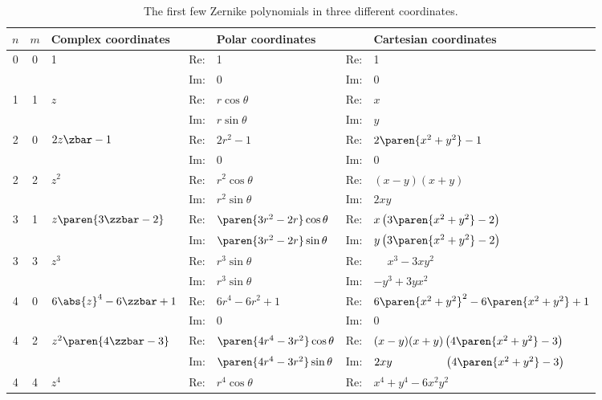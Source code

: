 \begin{landscape}
\begin{table}[htbp]
\caption[The first few Zernike polynomials in three different coordinates]{The first few Zernike polynomials in three different coordinates. }
\begin{center}
{\scriptsize
\begin{tabular}{cclllll}
%
 $n$ & $m$ & Complex coordinates && Polar coordinates && Cartesian coordinates \\\hline
%
 0 & 0 & 1 & Re: & 1 & Re: & 1 \\[2pt]
   &   &   & Im: & 0 & Im: & 0 \\[4pt]
%
  1 & 1 & $z$ & Re: & $r\cos\theta$ & Re: & $x$ \\[2pt]
    &   &     & Im: & $r\sin\theta$ & Im: & $y$ \\[4pt]
%
  2 & 0 & $2z\zbar-1$ 
    & Re: & $2r^{2}-1$ & Re: & $2\paren{x^{2} + y^{2}}-1$ \\[2pt]
    &   &        
    & Im: & 0 & Im: & 0 \\[2pt]
  2 & 2 & $z^{2}$ 
    & Re: & $r^{2}\cos\theta$ & Re: & $(x-y) (x+y)$ \\[2pt]
    &   &         
    & Im: & $r^{2}\sin\theta$ & Im: & $2xy$ \\[4pt]
%
  3 & 1 & $z\paren{3\zzbar-2}$ 
    & Re: & $\paren{3r^{2}-2r}\cos\theta$ 
    & Re: & $x \left(3 \paren{x^2 + y^2} - 2\right)$ \\[2pt]
    &   &         
    & Im: & $\paren{3r^{2}-2r}\sin\theta$ 
    & Im: & $y \left(3 \paren{x^2 + y^2} - 2\right)$ \\[2pt]
  3 & 3 & $z^{3}$ 
    & Re: & $r^{3}\sin\theta$ 
    & Re: & $\phantom{-}x^{3} - 3xy^{2}$ \\[2pt]
    &   &         
    & Im: & $r^{3}\sin\theta$ 
    & Im: & $-y^{3} + 3yx^{2}$ \\[4pt]
%
  4 & 0 & $6\abs{z}^{4}-6\zzbar+1$ & Re: & $6r^{4}-6r^{2}+1$ & Re: & $6\paren{x^{2} + y^{2}}^{2}-6\paren{x^{2} + y^{2}} + 1$ \\[2pt]
    &   &         & Im: & 0 & Im: & 0 \\[2pt]
  4 & 2 & $z^{2}\paren{4\zzbar-3}$ & Re: & $\paren{4r^{4}-3r^{2}}\cos\theta$ 
    & Re: & $(x-y) (x+y) \left(4 \paren{x^2 + y^2}-3\right)$ \\[2pt]
    &   &         
    & Im: & $\paren{4r^{4}-3r^{2}}\sin\theta$& Im: & $2 x y \qquad \qquad \ \ \left(4 \paren{x^2 + y^2}-3\right)$ \\[2pt]
  4 & 4 & $z^{4}$ & Re: & $r^{4}\cos\theta$ & Re: & $x^4+y^4-6 x^2 y^2$ \\[2pt]

\end{tabular}}
\end{center}
\end{table}
\end{landscape}
